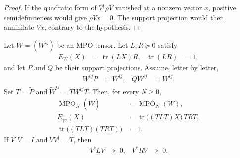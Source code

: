 \begin{proof}\leanok
    If the quadratic form of $V^\dagger\rho V$ vanished at a nonzero vector $x$,
    positive semidefiniteness would give $\rho Vx=0$. The support projection would
    then annihilate $Vx$, contrary to the hypothesis.
\end{proof}

\begin{lemma}
    \label{thm:mpu_reduced_representative}
    \leanok
    Let $W=(W^{ij})$ be an MPO tensor. Let $L,R\succeq0$ satisfy
    \begin{align}
        E_W(X)                & =\operatorname{tr}(LX)R, &
        \operatorname{tr}(LR) & =1,
    \end{align}
    and let $P$ and $Q$ be their support projections. Assume, letter by letter,
    \begin{align}
        W^{ij}P & =W^{ij}, & QW^{ij} & =W^{ij}.
    \end{align}
    Set $T=\widetilde P$ and $\widetilde W^{ij}=TW^{ij}T$. Then, for every
    $N\geq0$,
    \begin{align}
        \operatorname{MPO}_N(\widetilde W)        & =\operatorname{MPO}_N(W),                    \\
        E_{\widetilde W}(X)
                                                  & =\operatorname{tr}\!\bigl((TLT)X\bigr)\,TRT, \\
        \operatorname{tr}\!\bigl((TLT)(TRT)\bigr) & =1.
    \end{align}
    If $V^\dagger V=I$ and $VV^\dagger=T$, then
    \begin{align}
        V^\dagger LV & \succ0, & V^\dagger RV & \succ0.
    \end{align}
\end{lemma}

